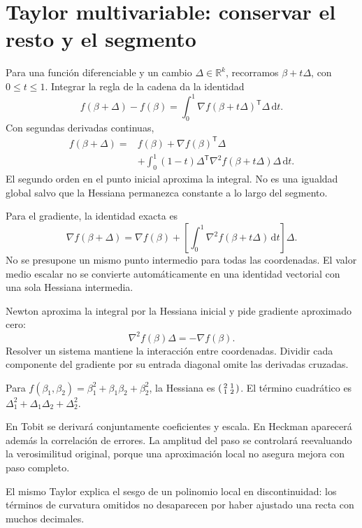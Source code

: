 \documentclass[11pt,a4paper]{article}
\newcommand{\T}{^{\mathsf T}}
\newcommand{\dd}{\,\mathrm d}
\begin{document}
\clearpage
\section{Taylor multivariable: conservar el resto y el segmento}\label{unidad12}
Para una función diferenciable y un cambio
\(\Delta\in\mathbb R^k\), recorramos
\(\beta+t\Delta\), con \(0\le t\le1\).
Integrar la regla de la cadena da la identidad
\[
f(\beta+\Delta)-f(\beta)
=\int_0^1\nabla f(\beta+t\Delta)\T\Delta\dd t.
\]
Con segundas derivadas continuas,
\[
\begin{aligned}
f(\beta+\Delta)
={}&f(\beta)+\nabla f(\beta)\T\Delta\\
&+\int_0^1(1-t)\Delta\T\nabla^2f(\beta+t\Delta)\Delta\dd t.
\end{aligned}
\]
El segundo orden en el punto inicial aproxima la integral.
No es una igualdad global salvo que la Hessiana
permanezca constante a lo largo del segmento.

Para el gradiente, la identidad exacta es
\[
\nabla f(\beta+\Delta)
=\nabla f(\beta)
+\left[\int_0^1\nabla^2f(\beta+t\Delta)\dd t\right]\Delta.
\]
No se presupone un mismo punto intermedio para
todas las coordenadas. El valor medio escalar
no se convierte automáticamente en una identidad
vectorial con una sola Hessiana intermedia.

Newton aproxima la integral por la Hessiana inicial
y pide gradiente aproximado cero:
\[
\nabla^2f(\beta)\Delta=-\nabla f(\beta).
\]
Resolver un sistema mantiene la interacción
entre coordenadas. Dividir cada componente del
gradiente por su entrada diagonal omite
las derivadas cruzadas.

\begin{ejemplo}
Para \(f(\beta_1,\beta_2)=\beta_1^2+\beta_1\beta_2+\beta_2^2\),
la Hessiana es
\(\begin{psmallmatrix}2&1\\1&2\end{psmallmatrix}\).
El término cuadrático es
\(\Delta_1^2+\Delta_1\Delta_2+\Delta_2^2\).
\end{ejemplo}
En Tobit se derivará conjuntamente coeficientes y escala.
En Heckman aparecerá además la correlación de errores.
La amplitud del paso se controlará reevaluando
la verosimilitud original, porque una aproximación
local no asegura mejora con paso completo.

El mismo Taylor explica el sesgo de un polinomio local
en discontinuidad: los términos de curvatura
omitidos no desaparecen por haber ajustado
una recta con muchos decimales.
\end{document}
